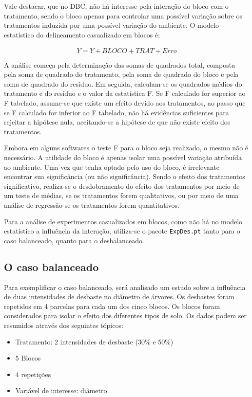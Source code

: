 \documentclass[
]{article}
\providecommand{\tightlist}{%
  \setlength{\itemsep}{0pt}\setlength{\parskip}{0pt}}
\begin{document}
Vale destacar, que no DBC, não há interesse pela interação do bloco com o tratamento, sendo o bloco apenas para controlar uma possível variação sobre os tratamentos induzida por uma possível variação do ambiente. O modelo estatístico do delineamento casualizado em blocos é:

\[Y = \bar{Y} + BLOCO + TRAT + Erro\]

A análise começa pela determinação das somas de quadrados total, composta pela soma de quadrado do tratamento, pela soma de quadrado do bloco e pela soma de quadrado do resíduo. Em seguida, calculam-se os quadrados médios do tratamento e do resíduo e o valor da estatística F. Se F calculado for superior ao F tabelado, assume-se que existe um efeito devido aos tratamentos, ao passo que se F calculado for inferior ao F tabelado, não há evidências suficientes para rejeitar a hipótese nula, aceitando-se a hipótese de que não existe efeito dos tratamentos.

Embora em alguns softwares o teste F para o bloco seja realizado, o mesmo não é necessário. A utilidade do bloco é apenas isolar uma possível variação atribuída ao ambiente. Uma vez que tenha optado pelo uso do bloco, é irrelevante encontrar sua significância (ou não significância). Sendo o efeito dos tratamentos significativo, realiza-se o desdobramento do efeito dos tratamentos por meio de um teste de médias, se os tratamentos forem qualitativos, ou por meio de uma análise de regressão se os tratamentos forem quantitativos.

Para a análise de experimentos casualizados em blocos, como não há no modelo estatístico a influência da interação, utiliza-se o pacote \texttt{ExpDes.pt} tanto para o caso balanceado, quanto para o desbalanceado.

\hypertarget{o-caso-balanceado-1}{%
\subsection{O caso balanceado}\label{o-caso-balanceado-1}}

Para exemplificar o caso balanceado, será analisado um estudo sobre a influência de duas intensidades de desbaste no diâmetro de árvores. Os desbastes foram repetidos em 4 parcelas para cada um dos cinco blocos. Os blocos foram considerados para isolar o efeito dos diferentes tipos de solo. Os dados podem ser resumidos através dos seguintes tópicos:

\begin{itemize}
\tightlist
\item
  Tratamento: 2 intensidades de desbaste (30\% e 50\%)
\item
  5 Blocos
\item
  4 repetições
\item
  Variável de interesse: diâmetro
\end{itemize}
\end{document}
